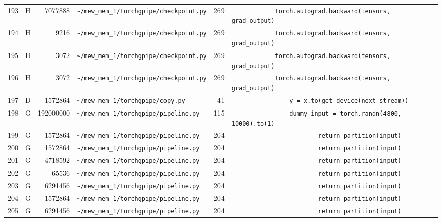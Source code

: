 \documentclass{article}
\begin{document}
\begin{longtable}{r l r p{6.5cm} r p{7.0cm}}
193 & H & 7077888 & \lstinline|~/mew_mem_1/torchgpipe/checkpoint.py| & 269 & \lstinline|            torch.autograd.backward(tensors, grad_output)| \\
194 & H & 9216 & \lstinline|~/mew_mem_1/torchgpipe/checkpoint.py| & 269 & \lstinline|            torch.autograd.backward(tensors, grad_output)| \\
195 & H & 3072 & \lstinline|~/mew_mem_1/torchgpipe/checkpoint.py| & 269 & \lstinline|            torch.autograd.backward(tensors, grad_output)| \\
196 & H & 3072 & \lstinline|~/mew_mem_1/torchgpipe/checkpoint.py| & 269 & \lstinline|            torch.autograd.backward(tensors, grad_output)| \\
197 & D & 1572864 & \lstinline|~/mew_mem_1/torchgpipe/copy.py| & 41 & \lstinline|                y = x.to(get_device(next_stream))| \\
198 & G & 192000000 & \lstinline|~/mew_mem_1/torchgpipe/pipeline.py| & 115 & \lstinline|                dummy_input = torch.randn(4800, 10000).to(1)| \\
199 & G & 1572864 & \lstinline|~/mew_mem_1/torchgpipe/pipeline.py| & 204 & \lstinline|                        return partition(input)| \\
200 & G & 1572864 & \lstinline|~/mew_mem_1/torchgpipe/pipeline.py| & 204 & \lstinline|                        return partition(input)| \\
201 & G & 4718592 & \lstinline|~/mew_mem_1/torchgpipe/pipeline.py| & 204 & \lstinline|                        return partition(input)| \\
202 & G & 65536 & \lstinline|~/mew_mem_1/torchgpipe/pipeline.py| & 204 & \lstinline|                        return partition(input)| \\
203 & G & 6291456 & \lstinline|~/mew_mem_1/torchgpipe/pipeline.py| & 204 & \lstinline|                        return partition(input)| \\
204 & G & 1572864 & \lstinline|~/mew_mem_1/torchgpipe/pipeline.py| & 204 & \lstinline|                        return partition(input)| \\
205 & G & 6291456 & \lstinline|~/mew_mem_1/torchgpipe/pipeline.py| & 204 & \lstinline|                        return partition(input)| \\
\end{longtable}
\end{document}
